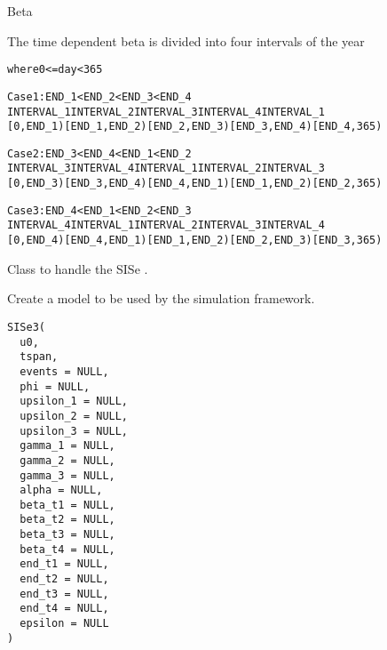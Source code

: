 \documentclass[letterpaper]{book}
\begin{document}
\begin{Section}{Beta}

The time dependent beta is divided into four intervals of the year
\begin{alltt}
where 0 <= day < 365

Case 1: END_1 < END_2 < END_3 < END_4
INTERVAL_1 INTERVAL_2     INTERVAL_3     INTERVAL_4     INTERVAL_1
[0, END_1) [END_1, END_2) [END_2, END_3) [END_3, END_4) [END_4, 365)

Case 2: END_3 < END_4 < END_1 < END_2
INTERVAL_3 INTERVAL_4     INTERVAL_1     INTERVAL_2     INTERVAL_3
[0, END_3) [END_3, END_4) [END_4, END_1) [END_1, END_2) [END_2, 365)

Case 3: END_4 < END_1 < END_2 < END_3
INTERVAL_4 INTERVAL_1     INTERVAL_2     INTERVAL_3     INTERVAL_4
[0, END_4) [END_4, END_1) [END_1, END_2) [END_2, END_3) [END_3, 365)
\end{alltt}

\end{Section}
%
\begin{Description}
Class to handle the SISe .
\end{Description}
%
\begin{Description}
Create a  model to be used by the simulation
framework.
\end{Description}
%
\begin{Usage}
\begin{verbatim}
SISe3(
  u0,
  tspan,
  events = NULL,
  phi = NULL,
  upsilon_1 = NULL,
  upsilon_2 = NULL,
  upsilon_3 = NULL,
  gamma_1 = NULL,
  gamma_2 = NULL,
  gamma_3 = NULL,
  alpha = NULL,
  beta_t1 = NULL,
  beta_t2 = NULL,
  beta_t3 = NULL,
  beta_t4 = NULL,
  end_t1 = NULL,
  end_t2 = NULL,
  end_t3 = NULL,
  end_t4 = NULL,
  epsilon = NULL
)
\end{verbatim}
\end{Usage}
%
\end{document}
